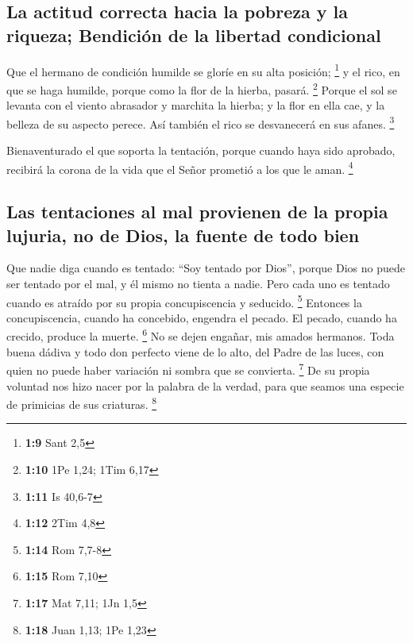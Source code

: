 \begin{paracol}{2}
\hypertarget{la-actitud-correcta-hacia-la-pobreza-y-la-riqueza-bendiciuxf3n-de-la-libertad-condicional}{%
\subsection{La actitud correcta hacia la pobreza y la riqueza; Bendición
de la libertad
condicional}\label{la-actitud-correcta-hacia-la-pobreza-y-la-riqueza-bendiciuxf3n-de-la-libertad-condicional}}

 Que el hermano de condición humilde se gloríe en su alta
posición; \footnote{\textbf{1:9} Sant 2,5}  y el rico, en
que se haga humilde, porque como la flor de la hierba, pasará.
\footnote{\textbf{1:10} 1Pe 1,24; 1Tim 6,17}  Porque el
sol se levanta con el viento abrasador y marchita la hierba; y la flor
en ella cae, y la belleza de su aspecto perece. Así también el rico se
desvanecerá en sus afanes. \footnote{\textbf{1:11} Is 40,6-7}

 Bienaventurado el que soporta la tentación, porque
cuando haya sido aprobado, recibirá la corona de la vida que el Señor
prometió a los que le aman. \footnote{\textbf{1:12} 2Tim 4,8}

\hypertarget{las-tentaciones-al-mal-provienen-de-la-propia-lujuria-no-de-dios-la-fuente-de-todo-bien}{%
\subsection{Las tentaciones al mal provienen de la propia lujuria, no de
Dios, la fuente de todo
bien}\label{las-tentaciones-al-mal-provienen-de-la-propia-lujuria-no-de-dios-la-fuente-de-todo-bien}}

 Que nadie diga cuando es tentado: ``Soy tentado por
Dios'', porque Dios no puede ser tentado por el mal, y él mismo no
tienta a nadie.  Pero cada uno es tentado cuando es
atraído por su propia concupiscencia y seducido. \footnote{\textbf{1:14}
  Rom 7,7-8}  Entonces la concupiscencia, cuando ha
concebido, engendra el pecado. El pecado, cuando ha crecido, produce la
muerte. \footnote{\textbf{1:15} Rom 7,10}  No se dejen
engañar, mis amados hermanos.  Toda buena dádiva y todo
don perfecto viene de lo alto, del Padre de las luces, con quien no
puede haber variación ni sombra que se convierta. \footnote{\textbf{1:17}
  Mat 7,11; 1Jn 1,5}  De su propia voluntad nos hizo
nacer por la palabra de la verdad, para que seamos una especie de
primicias de sus criaturas. \footnote{\textbf{1:18} Juan 1,13; 1Pe 1,23}


\end{paracol}

